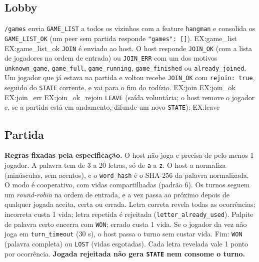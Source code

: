 \documentclass[11pt,a4paper]{article}
\begin{document}
\subsection{Lobby}
\texttt{/games} envia \texttt{GAME\_LIST} a todos os vizinhos com a feature \texttt{hangman} e consolida os \texttt{GAME\_LIST\_OK} (um peer sem partida responde \texttt{"games": []}).
{{EX:game_list}}
{{EX:game_list_ok}}
\texttt{JOIN} é enviado ao host. O host responde \texttt{JOIN\_OK} (com a lista de jogadores na ordem de entrada) ou \texttt{JOIN\_ERR} com um dos motivos \texttt{unknown\_game}, \texttt{game\_full}, \texttt{game\_running}, \texttt{game\_finished} ou \texttt{already\_joined}. Um jogador que já estava na partida e voltou recebe \texttt{JOIN\_OK} com \texttt{rejoin: true}, seguido do \texttt{STATE} corrente, e vai para o fim do rodízio.
{{EX:join}}
{{EX:join_ok}}
{{EX:join_err}}
{{EX:join_ok_rejoin}}
\texttt{LEAVE} (saída voluntária; o host remove o jogador e, se a partida está em andamento, difunde um novo \texttt{STATE}):
{{EX:leave}}

\subsection{Partida}
\textbf{Regras fixadas pela especificação.} O host não joga e precisa de pelo menos 1 jogador. A palavra tem de 3 a 20 letras, só de \texttt{a} a \texttt{z}. O host a normaliza (minúsculas, sem acentos), e o \texttt{word\_hash} é o SHA-256 da palavra normalizada. O modo é cooperativo, com vidas compartilhadas (padrão 6). Os turnos seguem um \emph{round-robin} na ordem de entrada, e a vez passa ao próximo depois de qualquer jogada aceita, certa ou errada. Letra correta revela todas as ocorrências; incorreta custa 1 vida; letra repetida é rejeitada (\texttt{letter\_already\_used}). Palpite de palavra certo encerra com \texttt{WON}; errado custa 1 vida. Se o jogador da vez não joga em \texttt{turn\_timeout} (30 s), o host passa o turno sem custar vida. Fim: \texttt{WON} (palavra completa) ou \texttt{LOST} (vidas esgotadas). Cada letra revelada vale 1 ponto por ocorrência. \textbf{Jogada rejeitada não gera \texttt{STATE} nem consome o turno.}
\end{document}
